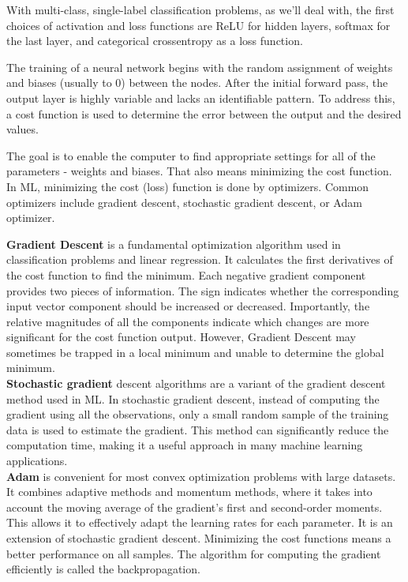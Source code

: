 With multi-class, single-label classification problems, as we'll deal with, the first choices of activation and loss functions are ReLU for hidden layers, softmax for the last layer, and categorical crossentropy as a loss function.



The training of a neural network begins with the random assignment of weights and biases (usually to 0) between the nodes. After the initial forward pass, the output layer is highly variable and lacks an identifiable pattern. To address this, a cost function is used to determine the error between the output and the desired values. 

The goal is to enable the computer to find appropriate settings for all of the parameters - weights and biases. That also means minimizing the cost function. \newline
In ML, minimizing the cost (loss) function is done by optimizers. Common optimizers include gradient descent, stochastic gradient descent, or Adam optimizer.


\textbf{Gradient Descent} is a fundamental optimization algorithm used in classification problems and linear regression. It calculates the first derivatives of the cost function to find the minimum. 
Each negative gradient component provides two pieces of information. The sign indicates whether the corresponding input vector component should be increased or decreased. Importantly, the relative magnitudes of all the components indicate which changes are more significant for the cost function output.
However, Gradient Descent may sometimes be trapped in a local minimum and unable to determine the global minimum.\\
\textbf{Stochastic gradient} descent algorithms are a variant of the gradient descent method used in ML. In stochastic gradient descent, instead of computing the gradient using all the observations, only a small random sample of the training data is used to estimate the gradient. This method can significantly reduce the computation time, making it a useful approach in many machine learning applications.\\
\textbf{Adam} is convenient for most convex optimization problems with large datasets. It combines adaptive methods and momentum methods, where it takes into account the moving average of the gradient's first and second-order moments. This allows it to effectively adapt the learning rates for each parameter.
It is an extension of stochastic gradient descent.\newline
Minimizing the cost functions means a better performance on all samples. The algorithm for computing the gradient efficiently is called the backpropagation.
